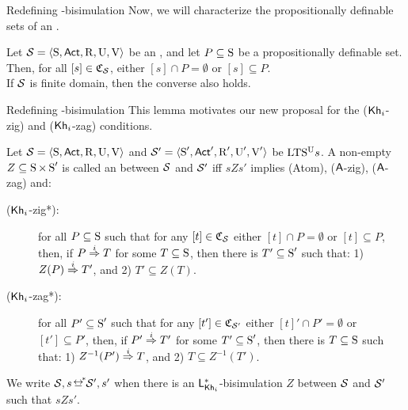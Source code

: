 \documentclass{beamer}
\begin{document}

\begin{frame}{Redefining \KHilogic-bisimulation}
    Now, we will characterize the propositionally definable sets of an \ults. \pause

    \vspace{5mm}


    \begin{lemma}
        \begin{small}
        Let $\mathcal{S}=\langle \operatorname{S},{\rm \sf Act},\operatorname{R},\operatorname{U},\operatorname{V} \rangle$ be an \ults, and let $P\subseteq \operatorname{S}$ be a propositionally definable set. Then, for all $[s]\in\mathfrak{C}_{\mathcal{S}}$, either $[s]\cap P =\emptyset$ or $[s]\subseteq P$. 
        \\If $\mathcal{S}$ is finite domain, then the converse also holds.
        \end{small}
    \end{lemma}
\end{frame}


\begin{frame}{Redefining \KHilogic-bisimulation}
    This lemma motivates our new proposal for the (${\operatorname{\sf Kh}_i}$-zig) and (${\operatorname{\sf Kh}_i}$-zag) conditions. \pause 

    \begin{footnotesize}
    \begin{definition}
        Let $\mathcal{S} = \langle \operatorname{S},{\rm \sf Act},\operatorname{R},\operatorname{U},\operatorname{V} \rangle$ and $\mathcal{S}' = \langle \operatorname{S}',{\rm \sf Act}',\operatorname{R}',\operatorname{U}',\operatorname{V}' \rangle$ be ${\textup{LTS$^\text{\textup{U}}$}}s$. 
        A non-empty $Z \subseteq \operatorname{S} \times \operatorname{S}'$ is called an  between $\mathcal{S}$ and $\mathcal{S}'$ iff $sZs'$ implies (Atom), (${\operatorname{\sf A}}$-zig), (${\operatorname{\sf A}}$-zag) and:
        \pause
        \begin{description} 
            \item[(${\operatorname{\sf Kh}_i}$-zig*):] 
            for all $P\subseteq\operatorname{S}$ such that for any $[t]\in\mathfrak{C}_{\mathcal{S}}$ either 
            $[t]\cap P =\emptyset$ or $[t]\subseteq P$, then, 
            if $P \stackrel{i}{\Rightarrow} T$ for some $T \subseteq \operatorname{S}$, then there is $T' \subseteq \operatorname{S}'$ such that: 
                1) $Z(P) \stackrel{i}{\Rightarrow} T'$, and
                2) $T' \subseteq Z(T)$.
                
            \item[(${\operatorname{\sf Kh}_i}$-zag*):] for all $P'\subseteq\operatorname{S}'$ such that for any $[t']\in\mathfrak{C}_{\mathcal{S}'}$ either 
            $[t]'\cap P' =\emptyset$ or $[t']\subseteq P'$, then, 
            if $P' \stackrel{i}{\Rightarrow} T'$ for some $T' \subseteq \operatorname{S}'$, then there is $T \subseteq \operatorname{S}$ such that: 
                1) $Z^{-1}(P') \stackrel{i}{\Rightarrow} T$, and
                2) $T \subseteq Z^{-1}(T')$.\pause

        \end{description}
        We write $\model,s \nbisim \model',s'$ when there is an
        $\mathsf{L}_{\operatorname{\sf Kh}_i}^*$-bisimulation $Z$ between $\mathcal{S}$ and $\mathcal{S}'$ such that
        $sZs'$.
    \end{definition}
\end{footnotesize}
\end{frame}
\end{document}
